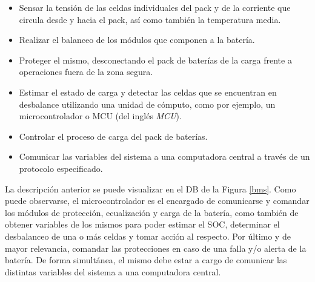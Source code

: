 \documentclass[10pt, a4paper]{report}
\begin{document}
\begin{itemize}
    \item Sensar la tensión de las celdas individuales del pack y de la 
	corriente que circula desde y hacia el pack, as\'i como tambi\'en 
	la temperatura media.
    \item Realizar el balanceo de los m\'odulos que componen a la bater\'ia.
    \item Proteger el mismo, desconectando el pack de bater\'ias de la carga
	frente a operaciones fuera de la zona segura.
    \item Estimar el estado de carga y detectar las celdas que se encuentran
	en desbalance utilizando una unidad de cómputo, como por ejemplo, un
	microcontrolador o \acrshort{MCU} (del ingl\'es \emph{\acrlong{MCU}}).
    \item Controlar el proceso de carga del pack de bater\'ias.
    \item Comunicar las variables del sistema a una computadora central a
	trav\'es de un protocolo especificado.
\end{itemize}

\noindent La descripción anterior se puede visualizar en el \acrfull{DB} de la
Figura \ref{bms}. Como puede observarse, el microcontrolador es el encargado de
comunicarse y comandar los módulos de protecci\'on, ecualizaci\'on y carga de 
la batería, como tambi\'en de obtener variables de los mismos para poder estimar 
el \acrshort{SOC}, determinar el desbalanceo de una o m\'as celdas y tomar 
acci\'on al respecto. Por último y de mayor relevancia, comandar las 
protecciones en caso de una falla y/o alerta de la batería. 
De forma simult\'anea, el mismo debe estar a cargo de comunicar las distintas 
variables del sistema a una computadora central.
\end{document}
